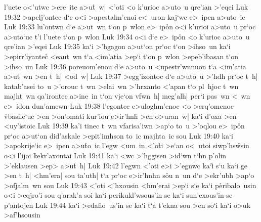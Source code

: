 l'uete
o<'utwc
>ere~ite
a>u\r{t}~w|
<'oti
<o
k'urioc
a>uto~u
qre'ian
>'eqei\bibvsend
\vs Luk 19:32
>apelj'ontec
d`e
o<i
>apestalm'enoi
e<~uron
kaj`wc
e>~ipen
a>uto~ic\bibvsend
\vs Luk 19:33
lu'ontwn
d`e
a>ut~wn
t`on
p~wlon
e>~ip\r{o}n
o<i
k'urioi
a>uto~u
pr`oc
a>uto`uc
t'i
l'uete
t`on
p~wlon\bibvsend
\vs Luk 19:34
o<i
d`e
e>~ip\r{o}n
<o
k'urioc
a>uto~u
qre'ian
>'eqei\bibvsend
\vs Luk 19:35
ka`i
>'hgagon
a>ut`on
pr`oc
t`on
>ihso~un
ka`i
>epirr'iyantec\r{}
<eaut~wn
t`a
<im'atia
>ep`i
t`on
p~wlon
>epeb'ibasan
t`on
>ihso~un\bibvsend
\vs Luk 19:36
poreuom'enou
d`e
a>uto~u
<upestr'wnnuon
t`a
<im'atia
a>ut~wn
>en
t~h|
<od~w|\bibvsend
\vs Luk 19:37
>egg'izontoc
d`e
a>uto~u
>'hdh
pr`oc
t~h|
katab'asei
to~u
>'orouc
t~wn
>elai~wn
>'hrxanto
<'apan
t`o
pl~hjoc
t~wn
majht~wn
qa'irontec
a>ine~in
t`on
vje`on
vfwn~h|
meg'alh|
per`i
pas~wn
<~wn
e>~idon
dun'amewn\bibvsend
\vs Luk 19:38
l'egontec
e>uloghm'enoc
<o
>erq'omenoc
\r{vb}asile`uc
>en
>on'omati
kur'iou
e>ir'hnh\r{}
>en
o>uran~w|
ka`i
d'oxa
>en
<uy'istoic\bibvsend
\vs Luk 19:39
ka'i
tinec
t~wn
vfarisa'iwn
>ap`o
to~u
>'oqlou
e>~ip\r{o}n
pr`oc
a>ut`on
did'askale
>epit'imhson
to~ic
majhta~ic
sou\bibvsend
\vs Luk 19:40
ka`i
>apokrije`ic
e>~ipen
a>u\r{t}o~ic
l'egw
<um~in
<'o\r{t}i
>e`an
o<~utoi
siwp'hs\r{w}sin
o<i
l'ijoi
\r{k}ekr'axontai\bibvsend
{}
\vs Luk 19:41
ka`i
<wc
>'hggisen
>id`wn
t`hn
p'olin
>'eklausen
>ep>
a>u\r{t}~h|\bibvsend
{}
\vs Luk 19:42
l'egwn
<'oti
e>i
>'egnwc
ka`i\r{}
s`u
ka`i
ge
>en
t~h|
<hm'era|
sou
ta'uth|
t`a
pr`oc
e>ir'hnhn
s\r{o}u
n~un
d`e
>ekr'ubh
>ap`o
>ofjalm~wn
sou\bibvsend
\vs Luk 19:43
<'oti
<'hxousin
<hm'erai
>ep`i
s`e
ka`i
p\r{e}ribalo~usin
o<i
>eqjro'i
sou
q'arak'a
soi
ka`i
perikukl'wsous'in
se
ka`i
sun'exous'in
se
p'antojen\bibvsend
\vs Luk 19:44
ka`i
>edafio~us'in
se
ka`i
t`a
t'ekna
sou
>en
so`i
ka`i
o>uk
>af'hsousin
